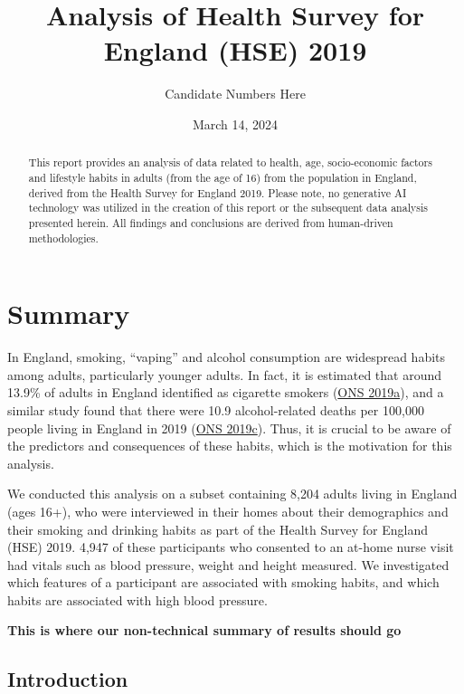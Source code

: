\documentclass[
  11pt,
  twocolumn]{article}
\title{Analysis of Health Survey for England (HSE) 2019}
\author{Candidate Numbers Here}
\date{March 14, 2024}
\begin{document}
\maketitle
\begin{abstract}
This report provides an analysis of data related to health, age,
socio-economic factors and lifestyle habits in adults (from the age of
16) from the population in England, derived from the Health Survey for
England 2019. Please note, no generative AI technology was utilized in
the creation of this report or the subsequent data analysis presented
herein. All findings and conclusions are derived from human-driven
methodologies.
\end{abstract}


\clearpage

\hypertarget{summary}{%
\section{Summary}\label{summary}}

In England, smoking, ``vaping'' and alcohol consumption are widespread
habits among adults, particularly younger adults. In fact, it is
estimated that around 13.9\% of adults in England identified as
cigarette smokers (\protect\hyperlink{ref-1ONS}{ONS 2019a}), and a
similar study found that there were 10.9 alcohol-related deaths per
100,000 people living in England in 2019
(\protect\hyperlink{ref-2ONS}{ONS 2019c}). Thus, it is crucial to be
aware of the predictors and consequences of these habits, which is the
motivation for this analysis.

We conducted this analysis on a subset containing 8,204 adults living in
England (ages 16+), who were interviewed in their homes about their
demographics and their smoking and drinking habits as part of the Health
Survey for England (HSE) 2019. 4,947 of these participants who consented
to an at-home nurse visit had vitals such as blood pressure, weight and
height measured. We investigated which features of a participant are
associated with smoking habits, and which habits are associated with
high blood pressure.

\textbf{This is where our non-technical summary of results should go}

\hypertarget{introduction}{%
\subsection{Introduction}\label{introduction}}
\end{document}
